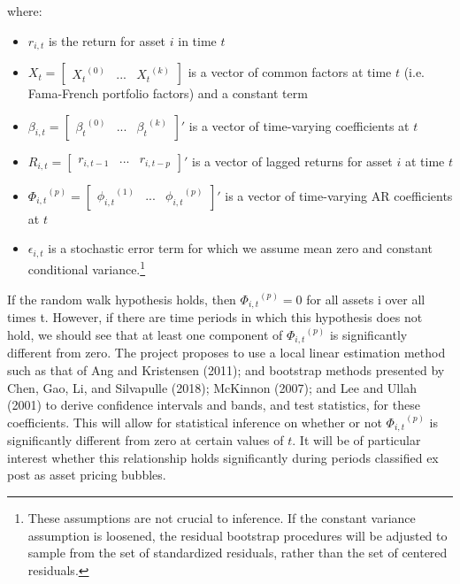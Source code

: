 \documentclass{article}
\begin{document}
where:
\begin{itemize}
	\item{\(r_{i,t}\) is the return for asset \(i\) in time \(t\)}
	\item{\(X_{t} = \begin{bmatrix}{X_{t}}^{(0)}&...&{X_{t}}^{(k)}\end{bmatrix}\) is a vector of common factors at time \(t\) (i.e. Fama-French portfolio factors) and a constant term}
	\item{\(\beta_{i,t} = \begin{bmatrix}{\beta_{t}}^{(0)}&...&{\beta_{t}}^{(k)}\end{bmatrix}'\) is a vector of time-varying coefficients at \(t\)}
	\item{\(R_{i,t} = \begin{bmatrix}r_{i,t-1}&...&r_{i,t-p}\end{bmatrix}'\) is a vector of lagged returns for asset \(i\) at time \(t\)}
	\item{\({\Phi_{i,t}}^{(p)} = \begin{bmatrix}{\phi_{i,t}}^{(1)}&...&{\phi_{i,t}}^{(p)}\end{bmatrix}'\) is a vector of time-varying AR coefficients at \(t\)}
	\item{\(\epsilon_{i,t}\) is a stochastic error term for which we assume mean zero and constant conditional variance.\footnote{These assumptions are not crucial to inference. If the constant variance assumption is loosened, the residual bootstrap procedures will be adjusted to sample from the set of standardized residuals, rather than the set of centered residuals.}}
\end{itemize}

\noindent
If the random walk hypothesis holds, then \({\Phi_{i,t}}^{(p)} = 0\) for all assets i over all times t. However, if there are time periods in which this hypothesis does not hold, we should see that at least one component of  \({\Phi_{i,t}}^{(p)}\) is significantly different from zero. The project proposes to use a local linear estimation method such as that of Ang and Kristensen (2011); and bootstrap methods presented by Chen, Gao, Li, and Silvapulle (2018); McKinnon (2007); and Lee and Ullah (2001) to derive confidence intervals and bands, and test statistics, for these coefficients. This will allow for statistical inference on whether or not  \({\Phi_{i,t}}^{(p)}\)  is significantly different from zero at certain values of \(t\). It will be of particular interest whether this relationship holds significantly during periods classified ex post as asset pricing bubbles.
\end{document}
